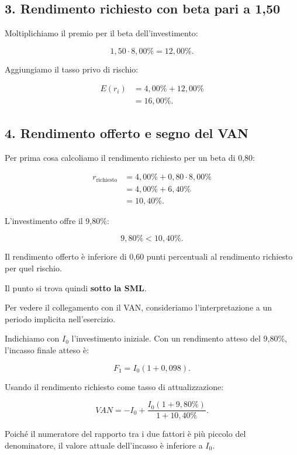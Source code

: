 \subsection*{3. Rendimento richiesto con beta pari a 1,50}

\noindent Moltiplichiamo il premio
per il beta dell'investimento:

\[
1{,}50\cdot8{,}00\%
=
12{,}00\%.
\]

\noindent Aggiungiamo il tasso privo di rischio:

\[
\begin{aligned}
E(r_i)
&=4{,}00\%+12{,}00\%\\
&=\boxed{16{,}00\%}.
\end{aligned}
\]


\subsection*{4. Rendimento offerto e segno del VAN}

\noindent Per prima cosa calcoliamo
il rendimento richiesto
per un beta di 0,80:

\[
\begin{aligned}
r_{\text{richiesto}}
&=4{,}00\%+0{,}80\cdot8{,}00\%\\
&=4{,}00\%+6{,}40\%\\
&=\boxed{10{,}40\%}.
\end{aligned}
\]

\noindent L'investimento offre il 9,80\%:

\[
9{,}80\%<10{,}40\%.
\]

\noindent Il rendimento offerto è inferiore
di 0,60 punti percentuali
al rendimento richiesto per quel rischio.

\noindent Il punto si trova quindi
\textbf{sotto la SML}.

\medskip

\noindent Per vedere il collegamento con il VAN,
consideriamo l'interpretazione a un periodo
implicita nell'esercizio.

\noindent Indichiamo con $I_0$ l'investimento iniziale.
Con un rendimento atteso del 9,80\%,
l'incasso finale atteso è:

\[
F_1=I_0(1+0{,}098).
\]

\noindent Usando il rendimento richiesto
come tasso di attualizzazione:

\[
VAN
=
-I_0+
\frac{I_0(1+9{,}80\%)}{1+10{,}40\%}.
\]

\noindent Poiché il numeratore del rapporto
tra i due fattori è più piccolo
del denominatore,
il valore attuale dell'incasso
è inferiore a $I_0$.

